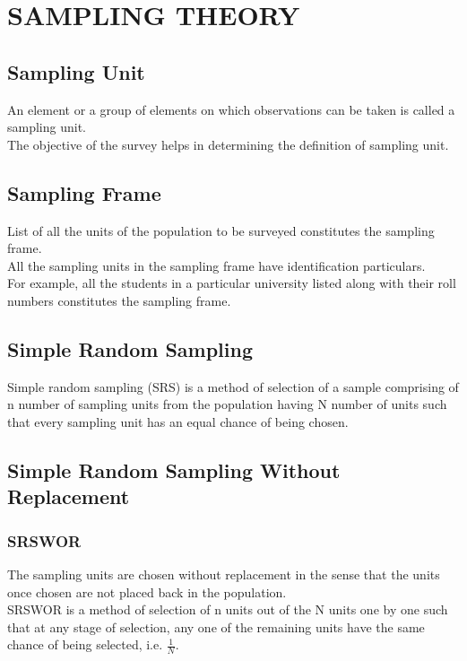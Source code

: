 \section*{SAMPLING THEORY}

\subsection*{Sampling Unit}
An element or a group of elements on which observations can be
taken is called a sampling unit.\\
The objective of the survey helps in determining the definition of
sampling unit.

\subsection*{Sampling Frame}
List of all the units of the population to be surveyed constitutes
the sampling frame.\\
All the sampling units in the sampling frame have identification
particulars.\\
For example, all the students in a particular university listed along
with their roll numbers constitutes the sampling frame.

\subsection*{Simple Random Sampling}
Simple random sampling (SRS) is a method of selection of a
sample comprising of n number of sampling units from the
population having N number of units such that every sampling
unit has an equal chance of being chosen.

\subsection*{Simple Random Sampling Without Replacement}
\subsubsection*{SRSWOR}
The sampling units are chosen without replacement in the sense
that the units once chosen are not placed back in the population.\\
SRSWOR is a method of selection of n units out of the N units one
by one such that at any stage of selection, any one of the
remaining units have the same chance of being selected, i.e. $\frac{1}{N}$.

